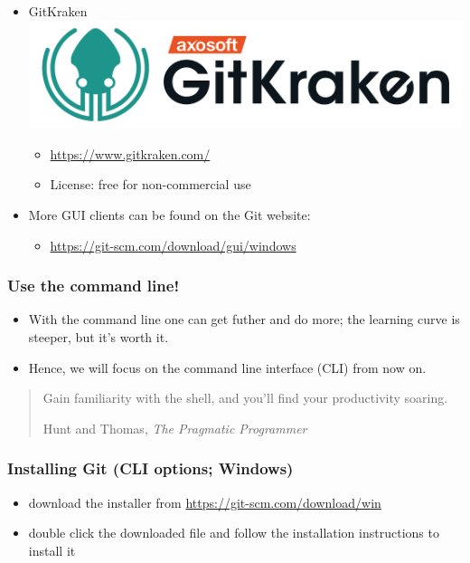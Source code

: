 \begin{frame}
\begin{itemize}
    \item GitKraken
        \includegraphics[height=0.05\textheight]{images/gitkraken-logo-dark-hz.png}
        \begin{itemize}
            \item \url{https://www.gitkraken.com/}
            \item License: free for non-commercial use
        \end{itemize}
    \item More GUI clients can be found on the Git website:
        \begin{itemize}
            \item \url{https://git-scm.com/download/gui/windows}
        \end{itemize}
\end{itemize}
\end{frame}


\begin{frame}
\frametitle{Use the command line!}
\begin{itemize}
    \item With the command line one can get futher and do more; the
        learning curve is steeper, but it's worth it.
    \item Hence, we will focus on the command line interface (CLI) from now
        on.
\end{itemize}
    \blockquote[Hunt and Thomas, \emph{The Pragmatic Programmer}]
    {Gain familiarity with the shell, and you'll find your productivity soaring.}
\end{frame}


\begin{frame}
\frametitle{Installing Git (CLI options; Windows)}
\begin{itemize}
    \item download the installer from \url{https://git-scm.com/download/win}
    \item double click the downloaded  file and follow the
        installation instructions to install it
\end{itemize}
\end{frame}



